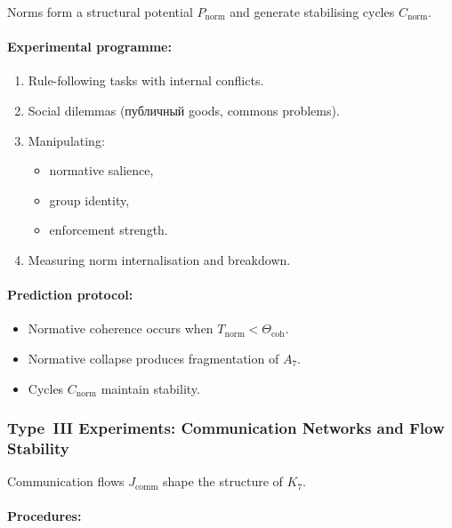 Norms form a structural potential $P_{\mathrm{norm}}$ and
generate stabilising cycles $C_{\mathrm{norm}}$.

\paragraph{Experimental programme:}

\begin{enumerate}
    \item Rule-following tasks with internal conflicts.
    \item Social dilemmas (публичный goods, commons problems).
    \item Manipulating:
          \begin{itemize}
              \item normative salience,
              \item group identity,
              \item enforcement strength.
          \end{itemize}
    \item Measuring norm internalisation and breakdown.
\end{enumerate}

\paragraph{Prediction protocol:}

\begin{itemize}
    \item Normative coherence occurs when
          $T_{\mathrm{norm}} < \Theta_{\mathrm{coh}}$.
    \item Normative collapse produces fragmentation of $A_7$.
    \item Cycles $C_{\mathrm{norm}}$ maintain stability.
\end{itemize}



\subsubsection{Type~III Experiments: Communication Networks and Flow Stability}

Communication flows $J_{\mathrm{comm}}$ shape the structure of $K_7$.

\paragraph{Procedures:}

